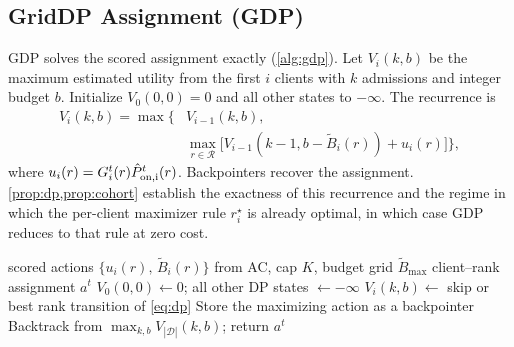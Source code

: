 \documentclass[a4paper,fleqn]{cas-dc}
\begin{document}
\subsection{GridDP Assignment (GDP)}
\label{sec:gdp}
GDP solves the scored assignment exactly (\cref{alg:gdp}). Let $V_i(k,b)$ be the maximum estimated utility from the first $i$ clients with $k$ admissions and integer budget $b$. Initialize $V_0(0,0)=0$ and all other states to $-\infty$. The recurrence is
\begin{equation}
\begin{aligned}
V_i(k,b)=\max\Big\{&
V_{i-1}(k,b),\\
&\max_{r\in\mathcal R}
\big[V_{i-1}(k-1,b-\widetilde B_i(r))+u_i(r)\big]
\Big\},
\end{aligned}
\label{eq:dp}
\end{equation}
where $u_i(r)=G_i^t(r)\hat P_{\rm on,i}^t(r)$. Backpointers recover the assignment. \cref{prop:dp,prop:cohort} establish the exactness of this recurrence and the regime in which the per-client maximizer rule $r_i^\star$ is already optimal, in which case GDP reduces to that rule at zero cost.
\par
\begin{algorithm}[tbp]
\caption{GridDP Assignment (GDP)}
\label{alg:gdp}
\begin{algorithmic}[1]
\Require scored actions $\{u_i(r),\,\widetilde B_i(r)\}$ from AC, cap $K$, budget grid $\widetilde B_{\max}$
\Ensure client--rank assignment $a^t$
\State $V_0(0,0)\gets 0$; all other DP states $\gets -\infty$
\State $V_i(k,b)\gets$ skip or best rank transition of \cref{eq:dp}
\State Store the maximizing action as a backpointer
\EndFor
\EndFor
\State Backtrack from $\max_{k,b}V_{|\mathcal D|}(k,b)$; return $a^t$
\end{algorithmic}
\end{algorithm}
\par
\end{document}
